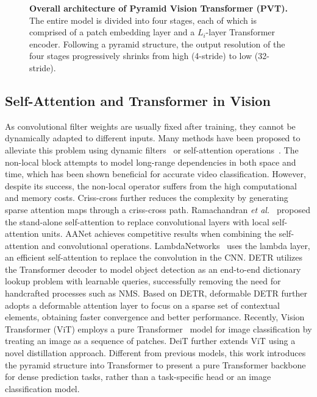 \documentclass[10pt,twocolumn,letterpaper]{article}
\def\etal{{\em et al.~}}
\begin{document}
\begin{figure*}[t]
		\centering
		\setlength{\fboxrule}{0pt}
		\caption{\textbf{Overall architecture of Pyramid Vision Transformer (PVT).} The entire model is divided into four stages, each of which is comprised of a patch embedding layer and a $L_i$-layer Transformer encoder. Following a pyramid structure, the output resolution of the four stages progressively shrinks from high (4-stride) to low (32-stride).}
		\label{fig:arch}
\end{figure*}


\subsection{Self-Attention and Transformer in Vision}


As convolutional filter weights are usually fixed after training, 
%
they cannot be dynamically adapted to different inputs.
Many methods have been proposed to alleviate this problem using dynamic filters~\cite{jia2016dynamic} or self-attention operations~\cite{vaswani2017attention}.
%
The non-local block \cite{wang2018non} attempts to model long-range dependencies in both space and time, which has been shown beneficial for accurate video classification.
However, despite its success, the non-local operator suffers from the high computational and memory costs. Criss-cross \cite{huang2019ccnet} further reduces the complexity by generating sparse attention maps through a criss-cross path. 
Ramachandran \etal\cite{ramachandran2019stand} proposed the stand-alone self-attention to replace convolutional layers with local self-attention units. 
AANet \cite{bello2019attention} achieves competitive results when combining the self-attention and convolutional operations.
LambdaNetworks~\cite{bello2021lambdanetworks} uses the lambda layer, an efficient self-attention to replace the convolution in the CNN.
%
DETR \cite{carion2020end} utilizes the Transformer decoder to model object detection as an end-to-end dictionary lookup problem with learnable queries,
%
successfully removing the need for handcrafted processes such as NMS. 
%
Based on DETR, deformable DETR \cite{zhu2020deformable} further adopts a deformable attention layer to focus on a sparse set of contextual elements, obtaining faster convergence and better performance.
%
Recently, Vision Transformer (ViT) \cite{dosovitskiy2020image} employs a pure Transformer~\cite{vaswani2017attention} model for image classification by treating an image as a sequence of patches.
%
DeiT \cite{touvron2020training} further extends ViT using a novel distillation approach. 
%
Different from previous models, this work introduces the pyramid structure into Transformer to present a pure Transformer backbone for dense prediction tasks, rather than a task-specific head or an image classification model.
%
\end{document}
